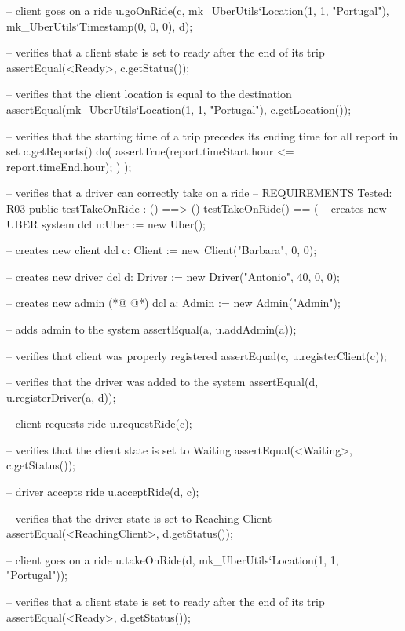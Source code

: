 \begin{vdmpp}[breaklines=true]
     -- client goes on a ride 
     u.goOnRide(c, mk_UberUtils`Location(1, 1, "Portugal"), mk_UberUtils`Timestamp(0, 0, 0), d);
    
    -- verifies that a client state is set to ready after the end of its trip
    assertEqual(<Ready>, c.getStatus());
    
    -- verifies that the client location is equal to the destination
    assertEqual(mk_UberUtils`Location(1, 1, "Portugal"), c.getLocation());
    
    -- verifies that the starting time of a trip precedes its ending time
    for all report in set c.getReports() do(
     assertTrue(report.timeStart.hour <= report.timeEnd.hour);
    )
   );
   
   -- verifies that a driver can correctly take on a ride
   -- REQUIREMENTS Tested: R03
  public testTakeOnRide : () ==> ()
   testTakeOnRide() == (
    -- creates new UBER system
     dcl u:Uber := new Uber();
     
     -- creates new client
     dcl c: Client := new Client("Barbara", 0, 0);
     
     -- creates new driver
    dcl d: Driver := new Driver("Antonio", 40, 0, 0);
    
    -- creates new admin
(*@
\label{testAll:158}
@*)
     dcl a: Admin := new Admin("Admin");
   
     -- adds admin to the system
     assertEqual({a}, u.addAdmin(a));
     
     -- verifies that client was properly registered
     assertEqual({c}, u.registerClient(c));
     
     -- verifies that the driver was added to the system
     assertEqual({d}, u.registerDriver(a, d));
     
     -- client requests ride
     u.requestRide(c);
     
     -- verifies that the client state is set to Waiting
     assertEqual(<Waiting>, c.getStatus());
     
     -- driver accepts ride
     u.acceptRide(d, c);
     
     -- verifies that the driver state is set to Reaching Client
     assertEqual(<ReachingClient>, d.getStatus());
     
     -- client goes on a ride 
     u.takeOnRide(d, mk_UberUtils`Location(1, 1, "Portugal"));
    
    -- verifies that a client state is set to ready after the end of its trip
    assertEqual(<Ready>, d.getStatus());
    

\end{vdmpp}
